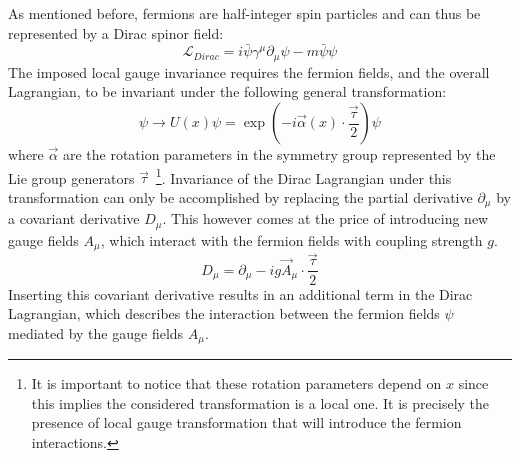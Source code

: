 As mentioned before, fermions are half-integer spin particles and can thus be represented by a Dirac spinor field:
\begin{equation} \label{eq::DiracL}
 \mathcal{L}_{Dirac} = i \bar{\psi} \gamma^{\mu} \partial_{\mu} \psi - m \bar{\psi} \psi
\end{equation}
The imposed local gauge invariance requires the fermion fields, and the overall Lagrangian, to be invariant under the following general transformation:
\begin{equation} \label{eq::GaugeTransf}
 \psi \rightarrow U(x) \psi =  \exp \left( -i \vec{\alpha}(x) \cdot \frac{\vec{\tau}}{2} \right) \psi
\end{equation}
where $\vec{\alpha}$ are the rotation parameters in the symmetry group represented by the Lie group generators $\vec{\tau}$~\footnote{It is important to notice that these rotation parameters depend on $x$ since this implies the considered transformation is a local one. It is precisely the presence of local gauge transformation that will introduce the fermion interactions.}.
Invariance of the Dirac Lagrangian under this transformation can only be accomplished by replacing the partial derivative $\partial_{\mu}$ by a covariant derivative $D_{\mu}$. This however comes at the price of introducing new gauge fields $A_{\mu}$, which interact with the fermion fields with coupling strength $g$.
\begin{equation} \label{eq::CovDer}
 D_{\mu} = \partial_{\mu} -i g \vec{A}_{\mu} \cdot \frac{\vec{\tau}}{2}
\end{equation}
Inserting this covariant derivative results in an additional term in the Dirac Lagrangian, which describes the interaction between the fermion fields $\psi$ mediated by the gauge fields $A_{\mu}$. 
